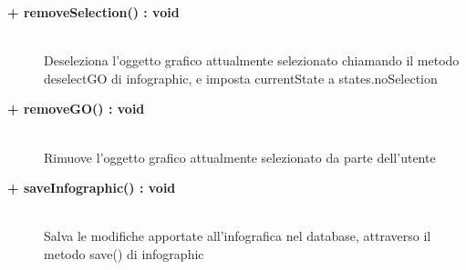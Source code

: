 \begin{description}
\begin{description}
	\end{description}
	
	\begin{description}
		\item[\textbf{\color{blue}+ removeSelection() : void 	}] \hfill \\
			Deseleziona l'oggetto grafico attualmente selezionato chiamando il metodo deselectGO di infographic, e imposta currentState a states.noSelection
	
	\end{description}
	
	\begin{description}
		\item[\textbf{\color{blue}+ removeGO() : void 	}] \hfill \\
			Rimuove l'oggetto grafico attualmente selezionato da parte dell'utente
	
	\end{description}
	
	\begin{description}
		\item[\textbf{\color{blue}+ saveInfographic() : void 	}] \hfill \\
			Salva le modifiche apportate all'infografica nel database, attraverso il metodo save() di infographic
	
	\end{description}
	

\end{description}
